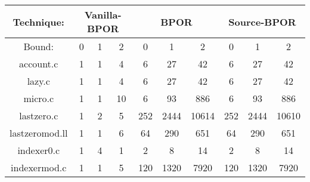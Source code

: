 \begin{center}
\begin{tabular}{ |c|c|c|c|c|c|c|c|c|c|}
\hline
\multicolumn{1}{|c|}{Technique:} & \multicolumn{3}{c|}{Vanilla-BPOR} & \multicolumn{3}{c|}{BPOR} & \multicolumn{3}{c|}{Source-BPOR} \\
\hline
Bound: & 0 & 1 & 2 & 0 & 1 & 2 & 0 & 1 & 2 \\
\hline \hline
account.c & 1 & 1 & 4 & 6 & 27 & 42 & 6 & 27 & 42 \\
\hline
lazy.c & 1 & 1 & 4 & 6 & 27 & 42 & 6 & 27 & 42 \\
\hline
micro.c & 1 & 1 & 10 & 6 & 93 & 886 & 6 & 93 & 886 \\
\hline
lastzero.c & 1 & 2 & 5 & 252 & 2444 & 10614 & 252 & 2444 & 10610 \\
\hline
lastzeromod.ll & 1 & 1 & 6 & 64 & 290 & 651 & 64 & 290 & 651 \\
\hline
indexer0.c & 1 & 4 & 1 & 2 & 8 & 14 & 2 & 8 & 14 \\
\hline
indexermod.c & 1 & 1 & 5 & 120 & 1320 & 7920 & 120 & 1320 & 7920 \\
\hline
\end{tabular}
\end{center}
